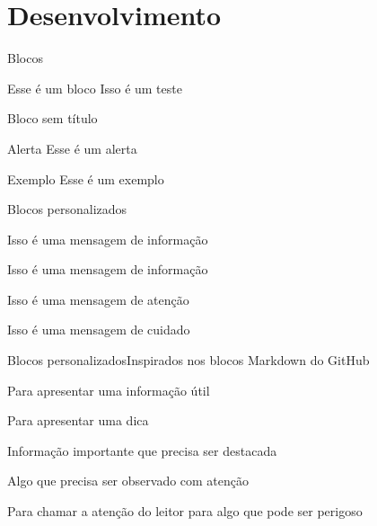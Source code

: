 \documentclass[aspectratio=169]{beamer}
\begin{document}
\section{Desenvolvimento}


\begin{frame}{Blocos}
    \begin{block}{Esse é um bloco}
        Isso é um teste
    \end{block}
    \begin{block}{}
    Bloco sem título	
    \end{block}
    \begin{alertblock}{Alerta}
        Esse é um alerta
    \end{alertblock}

    \begin{exampleblock}{Exemplo}
        Esse é um exemplo
    \end{exampleblock}
\end{frame}


\begin{frame}{Blocos personalizados}

    \begin{informacao}
    Isso é uma mensagem de informação
    \end{informacao}
    
    \begin{informacaoazul}
        Isso é uma mensagem de informação
    \end{informacaoazul}

    \begin{atencao}
        Isso é uma mensagem de atenção
    \end{atencao}
    
    \begin{cuidado}
        Isso é uma mensagem de cuidado
    \end{cuidado}
\end{frame}

\begin{frame}[allowframebreaks]{Blocos personalizados}{Inspirados nos blocos Markdown do GitHub}
\begin{nota}
    Para apresentar uma informação útil
\end{nota}

\begin{tip}
    Para apresentar uma dica
\end{tip}

\begin{important}
    Informação importante que precisa ser destacada
\end{important}

\begin{warning}
    Algo que precisa ser observado com atenção
\end{warning}

\begin{caution}
    Para chamar a atenção do leitor para algo que pode ser perigoso
\end{caution}
\end{frame}
\end{document}
